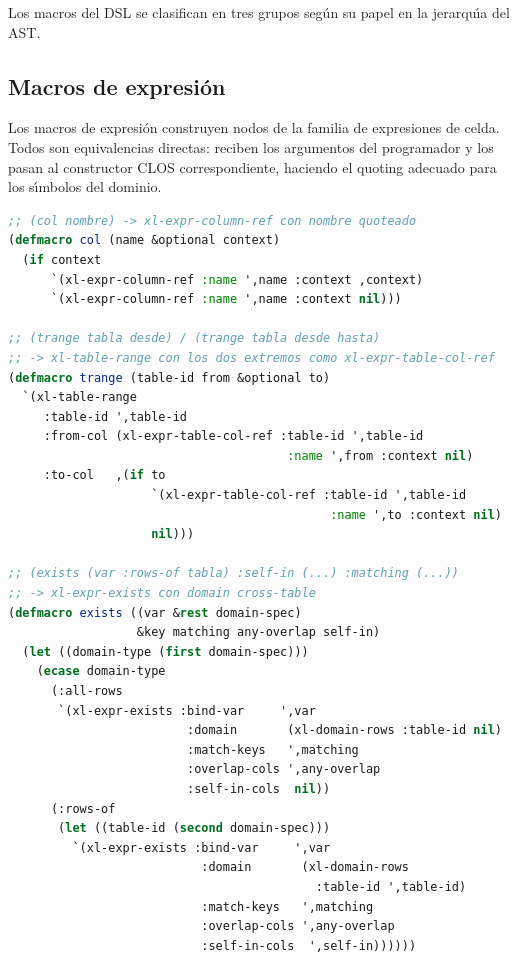 Los macros del DSL se clasifican en tres grupos seg\'un su papel en la
jerarqu\'{\i}a del AST.

\subsection{Macros de expresi\'on}
\label{ssec:macros-expresion}

Los macros de expresi\'on construyen nodos de la familia de expresiones de
celda.  Todos son equivalencias directas: reciben los argumentos del
programador y los pasan al constructor CLOS correspondiente, haciendo el
quoting adecuado para los s\'{\i}mbolos del dominio.

\begin{lstlisting}[language=CommonLisp,
  caption={Macros de expresi\'on representativos.}]
;; (col nombre) -> xl-expr-column-ref con nombre quoteado
(defmacro col (name &optional context)
  (if context
      `(xl-expr-column-ref :name ',name :context ,context)
      `(xl-expr-column-ref :name ',name :context nil)))

;; (trange tabla desde) / (trange tabla desde hasta)
;; -> xl-table-range con los dos extremos como xl-expr-table-col-ref
(defmacro trange (table-id from &optional to)
  `(xl-table-range
     :table-id ',table-id
     :from-col (xl-expr-table-col-ref :table-id ',table-id
                                       :name ',from :context nil)
     :to-col   ,(if to
                    `(xl-expr-table-col-ref :table-id ',table-id
                                             :name ',to :context nil)
                    nil)))

;; (exists (var :rows-of tabla) :self-in (...) :matching (...))
;; -> xl-expr-exists con domain cross-table
(defmacro exists ((var &rest domain-spec)
                  &key matching any-overlap self-in)
  (let ((domain-type (first domain-spec)))
    (ecase domain-type
      (:all-rows
       `(xl-expr-exists :bind-var     ',var
                         :domain       (xl-domain-rows :table-id nil)
                         :match-keys   ',matching
                         :overlap-cols ',any-overlap
                         :self-in-cols  nil))
      (:rows-of
       (let ((table-id (second domain-spec)))
         `(xl-expr-exists :bind-var     ',var
                           :domain       (xl-domain-rows
                                           :table-id ',table-id)
                           :match-keys   ',matching
                           :overlap-cols ',any-overlap
                           :self-in-cols  ',self-in))))))
\end{lstlisting}

